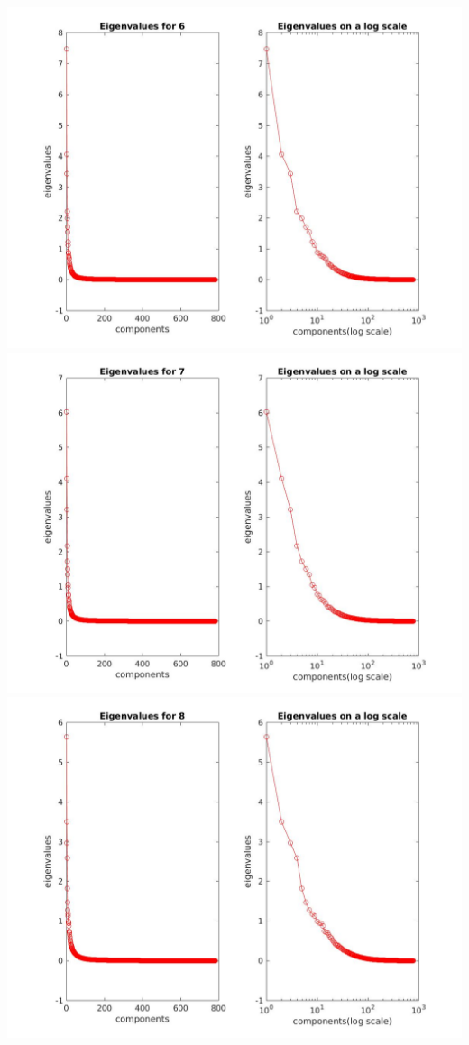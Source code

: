 \documentclass[12pt, a4paper]{article}
\begin{document}
\includegraphics[width=\textwidth, height = 0.25\paperheight]{Eigen_6}
\includegraphics[width=\textwidth, height = 0.25\paperheight]{Eigen_7}
\includegraphics[width=\textwidth, height = 0.25\paperheight]{Eigen_8}
\end{document}
